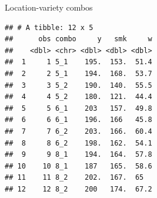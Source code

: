 \documentclass[ignorenonframetext,]{beamer}
\newenvironment{Shaded}{\begin{snugshade}}{\end{snugshade}}
\newcommand{\KeywordTok}[1]{\textcolor[rgb]{0.13,0.29,0.53}{\textbf{#1}}}
\newcommand{\NormalTok}[1]{#1}
\newcommand{\OperatorTok}[1]{\textcolor[rgb]{0.81,0.36,0.00}{\textbf{#1}}}
\newcommand{\StringTok}[1]{\textcolor[rgb]{0.31,0.60,0.02}{#1}}
\begin{document}
\begin{frame}[fragile]{Location-variety combos}
\protect\hypertarget{location-variety-combos}{}

\footnotesize

\begin{Shaded}
\end{Shaded}

\begin{verbatim}
## # A tibble: 12 x 5
##      obs combo     y   smk     w
##    <dbl> <chr> <dbl> <dbl> <dbl>
##  1     1 5_1    195.  153.  51.4
##  2     2 5_1    194.  168.  53.7
##  3     3 5_2    190.  140.  55.5
##  4     4 5_2    180.  121.  44.4
##  5     5 6_1    203   157.  49.8
##  6     6 6_1    196.  166   45.8
##  7     7 6_2    203.  166.  60.4
##  8     8 6_2    198.  162.  54.1
##  9     9 8_1    194.  164.  57.8
## 10    10 8_1    187   165.  58.6
## 11    11 8_2    202.  167.  65  
## 12    12 8_2    200   174.  67.2
\end{verbatim}

\normalsize

\end{frame}
\end{document}
